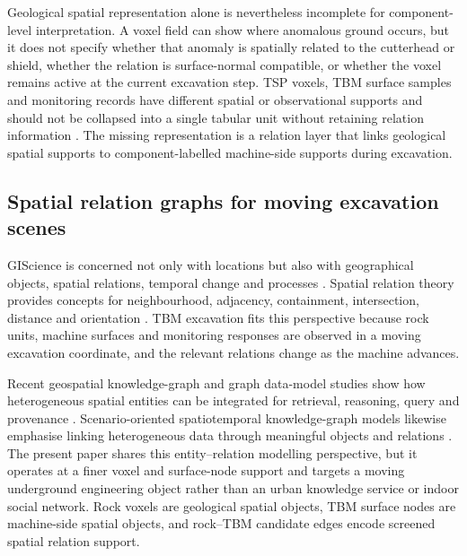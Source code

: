 Geological spatial representation alone is nevertheless incomplete for component-level interpretation. A voxel field can show where anomalous ground occurs, but it does not specify whether that anomaly is spatially related to the cutterhead or shield, whether the relation is surface-normal compatible, or whether the voxel remains active at the current excavation step. TSP voxels, TBM surface samples and monitoring records have different spatial or observational supports and should not be collapsed into a single tabular unit without retaining relation information \citep{goodchild1992geographical,longley2005geographic,openshaw1984modifiable}. The missing representation is a relation layer that links geological spatial supports to component-labelled machine-side supports during excavation.

\subsection{Spatial relation graphs for moving excavation scenes}
GIScience is concerned not only with locations but also with geographical objects, spatial relations, temporal change and processes \citep{goodchild1992geographical,worboys2004gis,galton2001spatial}. Spatial relation theory provides concepts for neighbourhood, adjacency, containment, intersection, distance and orientation \citep{egenhofer1991point,wu2008contiguity}. TBM excavation fits this perspective because rock units, machine surfaces and monitoring responses are observed in a moving excavation coordinate, and the relevant relations change as the machine advances.

Recent geospatial knowledge-graph and graph data-model studies show how heterogeneous spatial entities can be integrated for retrieval, reasoning, query and provenance \citep{zhu2026knowwheregraph,xu2025spatiotemporal,li2025question,rahimi2021topology}. Scenario-oriented spatiotemporal knowledge-graph models likewise emphasise linking heterogeneous data through meaningful objects and relations \citep{wang2025urbanphysical}. The present paper shares this entity--relation modelling perspective, but it operates at a finer voxel and surface-node support and targets a moving underground engineering object rather than an urban knowledge service or indoor social network. Rock voxels are geological spatial objects, TBM surface nodes are machine-side spatial objects, and rock--TBM candidate edges encode screened spatial relation support.


